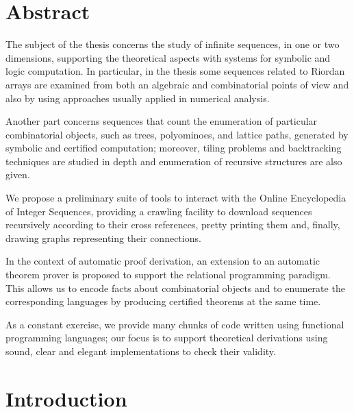 \documentclass[a4paper]{tufte-book}
\begin{document}
\blankpage



\blankpage



\cleardoublepage



\cleardoublepage

\chapter*{Abstract}

The subject of the thesis concerns the study of infinite sequences, in one or
two dimensions, supporting the theoretical aspects with systems for symbolic
and logic computation. In particular, in the thesis some sequences related to
Riordan arrays are examined from both an algebraic and combinatorial points of
view and also by using approaches usually applied in numerical analysis.

Another part concerns sequences that count the enumeration of particular
combinatorial objects, such as trees, polyominoes, and lattice paths,
generated by symbolic and certified computation; moreover, tiling problems
and backtracking techniques are studied in depth and enumeration of recursive
structures are also given.

We propose a preliminary suite of tools to interact with the Online
Encyclopedia of Integer Sequences, providing a crawling facility to download
sequences recursively according to their cross references, pretty printing them
and, finally, drawing graphs representing their connections.

In the context of automatic proof derivation, an extension to an automatic
theorem prover is proposed to support the relational programming paradigm.
This allows us to encode facts about combinatorial objects and to enumerate the
corresponding languages by producing certified theorems at the same time.

As a constant exercise, we provide many chunks of code written using functional
programming languages; our focus is to support theoretical derivations using
sound, clear and elegant implementations to check their validity.

\tableofcontents

\listoftables



\cleardoublepage

\chapter*{Introduction}

\end{document}
